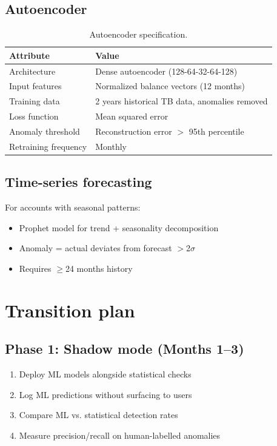 \documentclass[11pt,a4paper,twoside]{report}
\begin{document}
\subsection{Autoencoder}

\begin{table}[htbp]
\centering
\caption{Autoencoder specification.}
\footnotesize
\begin{tabularx}{\linewidth}{@{}l X@{}}
\toprule
\textbf{Attribute} & \textbf{Value} \\ \midrule
Architecture & Dense autoencoder (128-64-32-64-128) \\
Input features & Normalized balance vectors (12 months) \\
Training data & 2 years historical TB data, anomalies removed \\
Loss function & Mean squared error \\
Anomaly threshold & Reconstruction error $>$ 95th percentile \\
Retraining frequency & Monthly \\
\bottomrule
\end{tabularx}
\end{table}

\subsection{Time-series forecasting}

For accounts with seasonal patterns:
\begin{itemize}
\item Prophet model for trend + seasonality decomposition
\item Anomaly = actual deviates from forecast $>$2$\sigma$
\item Requires $\geq$24 months history
\end{itemize}

\section{Transition plan}

\subsection{Phase 1: Shadow mode (Months 1--3)}

\begin{enumerate}
\item Deploy ML models alongside statistical checks
\item Log ML predictions without surfacing to users
\item Compare ML vs. statistical detection rates
\item Measure precision/recall on human-labelled anomalies
\end{enumerate}
\end{document}
